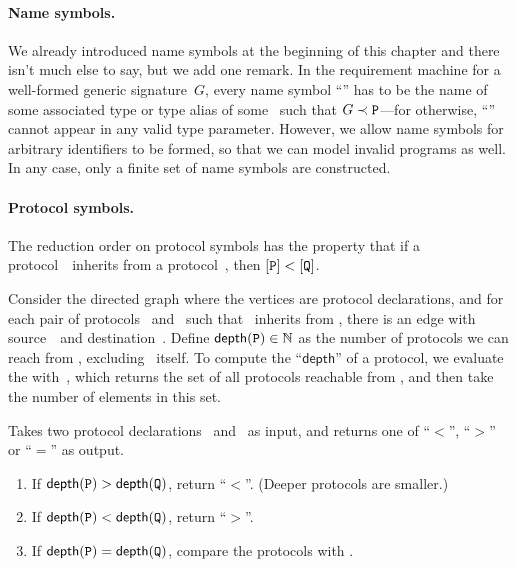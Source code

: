 \documentclass[../generics]{subfiles}
\begin{document}
\paragraph{Name symbols.}
We already introduced name symbols at the beginning of this chapter and there isn't much else to say, but we add one remark. In the requirement machine for a well-formed generic signature~$G$, every name symbol ``\nA'' has to be the name of some associated type or type alias of some \tP\ such that $G\prec\texttt{P}$---for otherwise, ``\nA'' cannot appear in any valid type parameter. However, we allow name symbols for arbitrary identifiers to be formed, so that we can model invalid programs as well. In any case, only a finite set of name symbols are constructed.

\paragraph{Protocol symbols.}
The reduction order on protocol symbols has the property that if a protocol~\tQ\ inherits from a protocol~\tP, then $[\texttt{P}]<[\texttt{Q}]$.

Consider the directed graph where the vertices are protocol declarations, and for each pair of protocols \tQ\ and \tP\ such that \tQ\ inherits from \tP, there is an edge with source~\tQ\ and destination~\tP. Define $\mathsf{depth}(\texttt{P})\in\mathbb{N}$ as the number of protocols we can reach from \tP, excluding \tP\ itself. To compute the ``$\mathsf{depth}$'' of a protocol, we evaluate the  with~\tP, which returns the set of all protocols reachable from \tP, and then take the number of elements in this set.

\begin{algorithm}\label{protocol reduction order} Takes two protocol declarations \tP\ and \tQ\ as input, and returns one of ``$<$'', ``$>$'' or ``$=$'' as output.
\begin{enumerate}
\item If $\mathsf{depth}(\texttt{P})>\mathsf{depth}(\texttt{Q})$, return ``$<$''. (Deeper protocols are smaller.)
\item If $\mathsf{depth}(\texttt{P})<\mathsf{depth}(\texttt{Q})$, return ``$>$''.
\item If $\mathsf{depth}(\texttt{P})=\mathsf{depth}(\texttt{Q})$, compare the protocols with .
\end{enumerate}
\end{algorithm}
\end{document}
